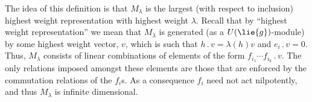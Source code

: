 \documentclass[fleqn]{NotesClass}
\newcommand{\action}{\mathbin{.}}
\begin{document}
    The idea of this definition is that \(M_\lambda\) is the largest (with respect to inclusion) highest weight representation with highest weight \(\lambda\).
    Recall that by \enquote{highest weight representation} we mean that \(M_\lambda\) is generated (as a \(U(\lie{g})\)-module) by some highest weight vector, \(v\), which is such that \(h \action v = \lambda(h) v\) and \(e_i \action v = 0\).
    Thus, \(M_\lambda\) consists of linear combinations of elements of the form \(f_{i_1} \dotsm f_{i_k} \action v\).
    The only relations imposed amongst these elements are those that are enforced by the commutation relations of the \(f_i\)s.
    As a consequence \(f_i\) need not act nilpotently, and thus \(M_\lambda\) is infinite dimensional.
    
    
    
    
%	    

    \backmatter
    \renewcommand{\glossaryname}{Acronyms}
    \printglossary[acronym]
    \printindex
\end{document}
